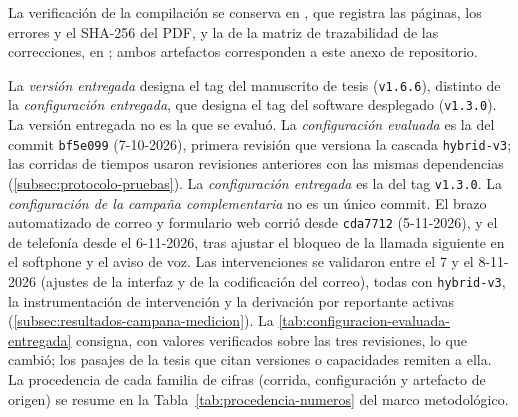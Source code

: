 La verificación de la compilación se conserva en , que registra las páginas, los errores y el SHA-256 del PDF, y la de la matriz de trazabilidad de las correcciones, en ; ambos artefactos corresponden a este anexo de repositorio.

La \emph{versión entregada} designa el tag del manuscrito de tesis (\texttt{v1.6.6}), distinto de la \emph{configuración entregada}, que designa el tag del software desplegado (\texttt{v1.3.0}). La versión entregada no es la que se evaluó. La \emph{configuración evaluada} es la del commit \texttt{bf5e099} (7-10-2026), primera revisión que versiona la cascada \texttt{hybrid-v3}; las corridas de tiempos usaron revisiones anteriores con las mismas dependencias (\autoref{subsec:protocolo-pruebas}). La \emph{configuración entregada} es la del tag \texttt{v1.3.0}. La \emph{configuración de la campaña complementaria} no es un único commit. El brazo automatizado de correo y formulario web corrió desde \texttt{cda7712} (5-11-2026), y el de telefonía desde el 6-11-2026, tras ajustar el bloqueo de la llamada siguiente en el softphone y el aviso de voz. Las intervenciones se validaron entre el 7 y el 8-11-2026 (ajustes de la interfaz y de la codificación del correo), todas con \texttt{hybrid-v3}, la instrumentación de intervención y la derivación por reportante activas (\autoref{subsec:resultados-campana-medicion}). La \autoref{tab:configuracion-evaluada-entregada} consigna, con valores verificados sobre las tres revisiones, lo que cambió; los pasajes de la tesis que citan versiones o capacidades remiten a ella. La procedencia de cada familia de cifras (corrida, configuración y artefacto de origen) se resume en la Tabla~\ref{tab:procedencia-numeros} del marco metodológico.

